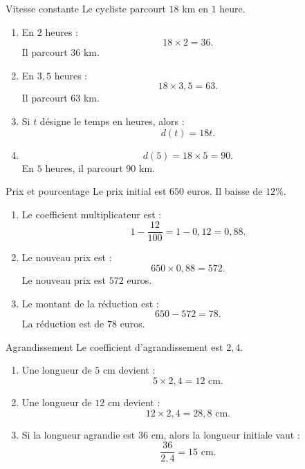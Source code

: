 \documentclass[11pt,a4paper]{article}
\begin{document}
\begin{correctionbox}{Vitesse constante}
Le cycliste parcourt $18$ km en $1$ heure.

\begin{enumerate}
    \item En $2$ heures :
    \[
    18\times 2=36.
    \]
    Il parcourt $36$ km.
    
    \item En $3{,}5$ heures :
    \[
    18\times 3{,}5=63.
    \]
    Il parcourt $63$ km.
    
    \item Si $t$ désigne le temps en heures, alors :
    \[
    d(t)=18t.
    \]
    
    \item
    \[
    d(5)=18\times 5=90.
    \]
    En $5$ heures, il parcourt $90$ km.
\end{enumerate}
\end{correctionbox}

\begin{correctionbox}{Prix et pourcentage}
Le prix initial est $650$ euros. Il baisse de $12\%$.

\begin{enumerate}
    \item Le coefficient multiplicateur est :
    \[
    1-\frac{12}{100}=1-0{,}12=0{,}88.
    \]
    
    \item Le nouveau prix est :
    \[
    650\times 0{,}88=572.
    \]
    Le nouveau prix est $572$ euros.
    
    \item Le montant de la réduction est :
    \[
    650-572=78.
    \]
    La réduction est de $78$ euros.
\end{enumerate}
\end{correctionbox}

\begin{correctionbox}{Agrandissement}
Le coefficient d'agrandissement est $2{,}4$.

\begin{enumerate}
    \item Une longueur de $5$ cm devient :
    \[
    5\times 2{,}4=12\text{ cm}.
    \]
    
    \item Une longueur de $12$ cm devient :
    \[
    12\times 2{,}4=28{,}8\text{ cm}.
    \]
    
    \item Si la longueur agrandie est $36$ cm, alors la longueur initiale vaut :
    \[
    \frac{36}{2{,}4}=15\text{ cm}.
    \]
\end{enumerate}
\end{correctionbox}
\end{document}
